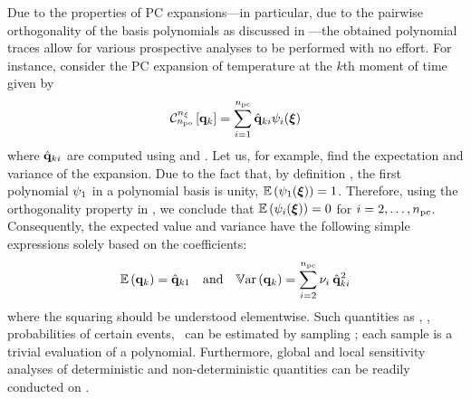 Due to the properties of PC expansions---in particular, due to the pairwise orthogonality of the basis polynomials as discussed in ---the obtained polynomial traces allow for various prospective analyses to be performed with no effort.
For instance, consider the PC expansion of temperature at the $k$th moment of time given by
\begin{equation} \elabel{pc-k}
  \oPC{\nvars}{\pcorder}{\vTO_k} = \sum_{i = 1}^{\pcterms} \pcc{\vTO}_{ki} \pcb_i(\vZ)
\end{equation}
where $\hat{\mathbf{q}}_{ki}$ are computed using  and . Let us, for example, find the expectation and variance of the expansion.
Due to the fact that, by definition \cite{xiu2010}, the first polynomial $\psi_1$ in a polynomial basis is unity, $\mathbb{E}\left(\psi_1(\boldsymbol{\xi})\right) = 1$.
Therefore, using the orthogonality property in , we conclude that $\mathbb{E}\left(\psi_i(\boldsymbol{\xi})\right) = 0$ for $i = 2, \dotsc, {n_\text{pc}}$.
Consequently, the expected value and variance have the following simple expressions solely based on the coefficients:
\begin{equation} \elabel{pc-moments}
  \oExp{\vTO_k} = \pcc{\vTO}_{k1} \hspace{1em} \text{and} \hspace{1em} \oVar{\vTO_k} = \sum_{i = 2}^{\pcterms} \pcn_i \: \pcc{\vTO}_{ki}^2
\end{equation}
where the squaring should be understood elementwise.
Such quantities as \cdfs, \pdfs, probabilities of certain events, \etc\ can be estimated by sampling ; each sample is a trivial evaluation of a polynomial.
Furthermore, global and local sensitivity analyses of deterministic and non-deterministic quantities can be readily conducted on .
